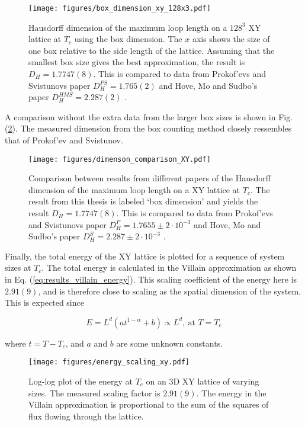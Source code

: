 \begin{figure}[h!]
    \centering
        \texttt{[image: figures/box\_dimension\_xy\_128x3.pdf]}
    \caption{Hausdorff dimension of the maximum loop length on a $128^3$ XY lattice at $T_c$ using the box dimension. The $x$ axis shows the size of one box relative to the side length of the lattice. Assuming that the smallest box size gives the best approximation, the result is $D_H = 1.7747(8)$. This is compared to data from Prokof'evs and Svistunovs paper $D_H^{PS} = 1.765(2)$ \cite{Prokofev:comment_on_hove_hausdorff_crit_fluct} and Hove, Mo and Sudbo's paper $D_H^{HMS} = 2.287(2)$ \cite{Hove:hausdorff_crit_fluctuations}.}
    \label{fig:results_boxdimension_xy}
\end{figure}


\newpage

A comparison without the extra data from the larger box sizes is shown in Fig. (\ref{fig:dim_comparison_xy}). The measured dimension from the box counting method closely ressembles that of Prokof'ev and Svistunov.

\begin{figure}[h!]
    \centering
        \texttt{[image: figures/dimenson\_comparison\_XY.pdf]}
    \caption{Comparison between results from different papers of the Hausdorff dimension of the maximum loop length on a XY lattice at $T_c$. The result from this thesis is labeled `box dimension' and yields the result $D_H = 1.7747(8)$. This is compared to data from Prokof'evs and Svistunovs paper $D_H^P = 1.7655 \pm 2 \cdot 10^{-3}$ \cite{Prokofev:comment_on_hove_hausdorff_crit_fluct} and Hove, Mo and Sudbo's paper $D_H^S = 2.287 \pm 2 \cdot 10^{-3}$ \cite{Hove:hausdorff_crit_fluctuations}.}
    \label{fig:dim_comparison_xy}
\end{figure}

\newpage

Finally, the total energy of the XY lattice is plotted for a sequence of system sizes at $T_c$. The total energy is calculated in the Villain approximation as shown in Eq. (\ref{eq:results_villain_energy}). This scaling coefficient of the energy here is $2.91(9)$, and is therefore close to scaling as the spatial dimension of the system. This is expected since 

\begin{equation}
    E = L^d ( a t^{1 - \alpha} + b ) \propto L^d, \ \text{at $T = T_c$}
\end{equation}

\noindent where $t = T - T_c$, and $a$ and $b$ are some unknown constants.

\begin{figure}[h!]
    \centering
        \texttt{[image: figures/energy\_scaling\_xy.pdf]}
    \caption{Log-log plot of the energy at $T_c$ on an 3D XY lattice of varying sizes. The measured scaling factor is $2.91(9)$. The energy in the Villain approximation is proportional to the sum of the squares of flux flowing through the lattice.}
    \label{fig:results_energyxy}
\end{figure}



